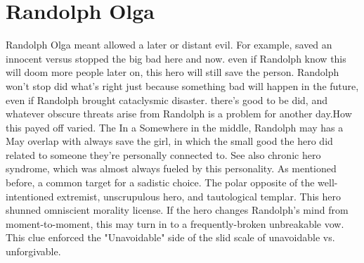 \documentclass[12pt]{book}
\begin{document}
\chapter{Randolph Olga}

Randolph Olga meant allowed a later or distant evil. For example, saved an innocent versus stopped the big bad here and now. even if Randolph know this will doom more people later on, this hero will still save the person. Randolph won't stop did what's right just because something bad will happen in the future, even if Randolph brought cataclysmic disaster. there's good to be did, and whatever obscure threats arise from Randolph is a problem for another day.How this payed off varied. The In a Somewhere in the middle, Randolph may has a May overlap with always save the girl, in which the small good the hero did related to someone they're personally connected to. See also chronic hero syndrome, which was almost always fueled by this personality. As mentioned before, a common target for a sadistic choice. The polar opposite of the well-intentioned extremist, unscrupulous hero, and tautological templar. This hero shunned omniscient morality license. If the hero changes Randolph's mind from moment-to-moment, this may turn in to a frequently-broken unbreakable vow. This clue enforced the "Unavoidable" side of the slid scale of unavoidable vs. unforgivable.
\end{document}
